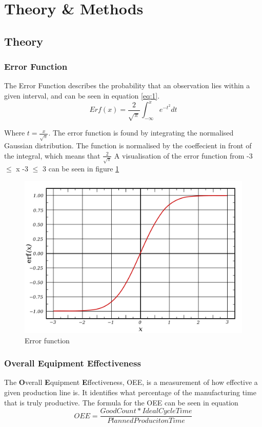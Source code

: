\section{Theory \& Methods}

\subsection{Theory}

\subsubsection{Error Function}
The Error Function describes the probability that an observation lies within
a given interval, and can be seen in equation \ref{eq:1}.
\begin{equation} \label{eq:1}
    Erf(x)=\frac{2}{\sqrt{\pi}} \int_{-\infty}^x e^{-t^2} dt
\end{equation}

Where \(t=\frac{x}{\sqrt{\pi}}\). The error function is found by integrating
the normalised Gaussian distribution. The function is normalised by the
coeffecient in front of the integral, which means that \(\frac{2}{\sqrt{\pi}}\)
A visualisation of the error function from -3 $\leq$ x -3 $\leq$ 3 can be seen
in figure \ref{figure:error_function}

\begin{figure}[ht]
    \centering
    \includegraphics[scale=0.3]{images/error_function.png}
    \caption{Error function}
    \label{figure:error_function}
\end{figure}

\subsubsection{Overall Equipment Effectiveness}
The \textbf{O}verall \textbf{E}quipment \textbf{E}ffectiveness, OEE, is a
measurement of how effective a given production line is. It identifies what
percentage of the manufacturing time that is truly productive. The formula for
the OEE can be seen in equation 
\begin{equation} \label{eq:2}
    OEE = \frac{Good Count * Ideal Cycle Time}{Planned Produciton Time}
\end{equation}

